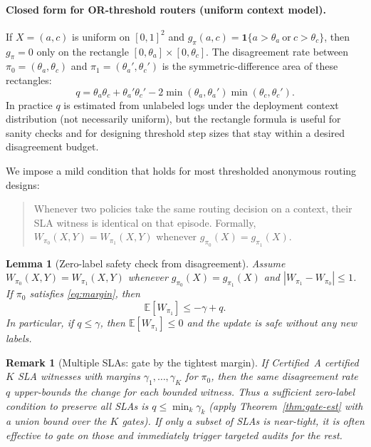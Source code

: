 \documentclass[11pt]{article}
\newtheorem{lemma}{Lemma}
\newtheorem{remark}{Remark}
\begin{document}
\paragraph{Closed form for OR-threshold routers (uniform context model).}
If $X=(a,c)$ is uniform on $[0,1]^2$ and $g_{\pi}(a,c)=\mathbf{1}\{a>\theta_a \ \text{or}\ c>\theta_c\}$, then $g_{\pi}=0$ only on the rectangle $[0,\theta_a]\times[0,\theta_c]$.
The disagreement rate between $\pi_0=(\theta_a,\theta_c)$ and $\pi_1=(\theta_a',\theta_c')$ is the symmetric-difference area of these rectangles:
\begin{equation}
q = \theta_a\theta_c + \theta_a'\theta_c' - 2\min(\theta_a,\theta_a')\min(\theta_c,\theta_c').
\label{eq:disagree-area}
\end{equation}
In practice $q$ is estimated from unlabeled logs under the deployment context distribution (not necessarily uniform), but the rectangle formula is useful for sanity checks and for designing threshold step sizes that stay within a desired disagreement budget.

We impose a mild condition that holds for most thresholded anonymous routing designs:
\begin{quote}
Whenever two policies take the same routing decision on a context, their SLA witness is identical on that episode.
Formally, $W_{\pi_0}(X,Y)=W_{\pi_1}(X,Y)$ whenever $g_{\pi_0}(X)=g_{\pi_1}(X)$.
\end{quote}

\begin{lemma}[Zero-label safety check from disagreement]
\label{lem:disagree}
Assume $W_{\pi_0}(X,Y)=W_{\pi_1}(X,Y)$ whenever $g_{\pi_0}(X)=g_{\pi_1}(X)$ and $|W_{\pi_1}-W_{\pi_0}|\le 1$.
If $\pi_0$ satisfies \eqref{eq:margin}, then
\[
\mathbb{E}[W_{\pi_1}] \le -\gamma + q.
\]
In particular, if $q\le \gamma$, then $\mathbb{E}[W_{\pi_1}]\le 0$ and the update is safe \emph{without any new labels}.
\end{lemma}

\begin{remark}[Multiple SLAs: gate by the tightest margin]
If Certified~A certified $K$ SLA witnesses with margins $\gamma_1,\dots,\gamma_K$ for $\pi_0$, then the same disagreement rate $q$ upper-bounds the change for each bounded witness.
Thus a sufficient zero-label condition to preserve \emph{all} SLAs is $q\le \min_k \gamma_k$ (apply Theorem~\ref{thm:gate-est} with a union bound over the $K$ gates).
If only a subset of SLAs is near-tight, it is often effective to gate on those and immediately trigger targeted audits for the rest.
\end{remark}
\end{document}
